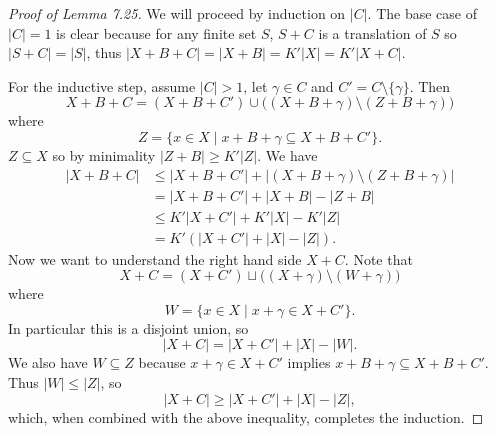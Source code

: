\begin{proof}[Proof of Lemma 7.25]
We will proceed by induction on $|C|$. The base case of $|C|=1$ is clear because for any finite set $S$, $S+C$ is a translation of $S$ so $|S+C|=|S|$, thus $|X+B+C|=|X+B|=K'|X|=K'|X+C|$.

For the inductive step, assume $|C|>1$, let $\gamma\in C$ and $C'=C\setminus\{\gamma\}$. Then
\[X+B+C=(X+B+C')\cup\bigl((X+B+\gamma)\setminus(Z+B+\gamma)\bigr)\]
where
\[Z=\{x\in X\mid x+B+\gamma\subseteq X+B+C'\}.\]
$Z\subseteq X$ so by minimality $|Z+B|\geq K'|Z|$. We have
\begin{align*}
|X+B+C|&\leq |X+B+C'|+|(X+B+\gamma)\setminus(Z+B+\gamma)|\\
&=|X+B+C'|+|X+B|-|Z+B|\\
&\leq K'|X+C'|+K'|X|-K'|Z|\\
&=K'(|X+C'|+|X|-|Z|).
\end{align*}
Now we want to understand the right hand side $X+C$. Note that
\[X+C=(X+C')\sqcup\bigl((X+\gamma)\setminus(W+\gamma)\bigr)\]
where
\[W=\{x\in X\mid x+\gamma\in X+C'\}.\]
In particular this is a disjoint union, so
\[|X+C|=|X+C'|+|X|-|W|.\]
We also have $W\subseteq Z$ because $x+\gamma\in X+C'$ implies $x+B+\gamma\subseteq X+B+C'$. Thus $|W|\leq|Z|$, so
\[|X+C|\geq |X+C'|+|X|-|Z|,\]
which, when combined with the above inequality, completes the induction.
\end{proof}
